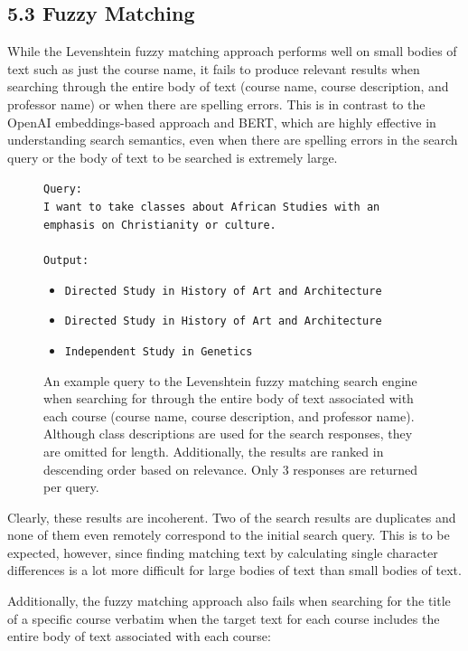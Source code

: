 \documentclass[
	a4paper, %
	10pt, %
	unnumberedsections, %
	twoside, %
]{LTJournalArticle}
\begin{document}
\subsection{5.3 Fuzzy Matching}


While the Levenshtein fuzzy matching approach performs well on small bodies of text such as just the course name, it fails to produce relevant results when searching through the entire body of text (course name, course description, and professor name) or when there are spelling errors. This is in contrast to the OpenAI embeddings-based approach and BERT, which are highly effective in understanding search semantics, even when there are spelling errors in the search query or the body of text to be searched is extremely large. 


\begin{figure}[h]
	\begin{center}
		\texttt{Query:} \\
		\texttt{I want to take classes about African Studies with an emphasis on Christianity or culture.} \\
		\texttt{}\\
		\texttt{Output:} 
		\begin{itemize}
			\item \texttt{Directed Study in History of Art and Architecture}
			\item \texttt{Directed Study in History of Art and Architecture}
			\item \texttt{Independent Study in Genetics}
		\end{itemize}		
	\end{center}
	\caption{An example query to the Levenshtein fuzzy matching search engine when searching for through the entire body of text associated with each course (course name, course description, and professor name). Although class descriptions are used for the search responses, they are omitted for length. Additionally, the results are ranked in descending order based on relevance. Only 3 responses are returned per query.}
\end{figure}

Clearly, these results are incoherent. Two of the search results are duplicates and none of them even remotely correspond to the initial search query. This is to be expected, however, since finding matching text by calculating single character differences is a lot more difficult for large bodies of text than small bodies of text. 

Additionally, the fuzzy matching approach also fails when searching for the title of a specific course verbatim when the target text for each course includes the entire body of text associated with each course:
\end{document}
